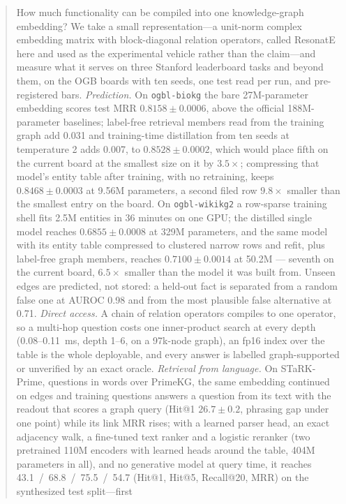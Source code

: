 \documentclass[11pt,a4paper]{article}
\begin{document}
\begin{abstract}
How much functionality can be compiled into one knowledge-graph
embedding? We take a small representation---a unit-norm complex
embedding matrix with block-diagonal relation operators, called ResonatE here and
used as the experimental vehicle rather than the claim---and measure
what it serves on three Stanford leaderboard tasks and beyond them, on
the OGB boards with ten seeds, one test read per run, and
pre-registered bars.
\emph{Prediction.} On \texttt{ogbl-biokg} the bare 27M-parameter embedding
scores test MRR $0.8158\pm0.0006$, above the official 188M-parameter
baselines; label-free retrieval members read from the training graph add
0.031 and training-time distillation from ten seeds at temperature 2 adds
0.007, to $0.8528\pm0.0002$, which would place fifth on the current
board at the smallest size on it by $3.5\times$; compressing that model's
entity table after training, with no retraining, keeps $0.8468\pm0.0003$ at
9.56M parameters, a second filed row $9.8\times$ smaller than the smallest
entry on the board. On \texttt{ogbl-wikikg2} a row-sparse training shell
fits 2.5M entities in 36 minutes on one GPU; the distilled single model
reaches $0.6855\pm0.0008$ at 329M parameters, and the same model with its
entity table compressed to clustered narrow rows and refit, plus
label-free graph members, reaches $0.7100\pm0.0014$ at 50.2M --- seventh on
the current board, $6.5\times$ smaller than the model it was built from. Unseen edges are predicted, not
stored: a held-out fact is separated from a random false one at AUROC
0.98 and from the most plausible false alternative at 0.71.
\emph{Direct access.} A chain of relation operators compiles to one
operator, so a multi-hop question costs one inner-product search at
every depth (0.08--0.11~ms, depth 1--6, on a 97k-node graph), an fp16
index over the table is the whole deployable, and every answer is
labelled graph-supported or unverified by an exact oracle.
\emph{Retrieval from language.} On STaRK-Prime, questions in words over
PrimeKG, the same embedding continued on edges and training questions
answers a question from its text with the readout that scores a graph
query (Hit@1 $26.7\pm0.2$, phrasing gap under one point) while its link
MRR rises; with a learned parser head, an exact adjacency walk, a
fine-tuned text ranker and a logistic reranker (two pretrained 110M
encoders with learned heads around the table, 404M parameters in all),
and no generative model at query time, it reaches 43.1~/~68.8~/~75.5~/~54.7
(Hit@1, Hit@5, Recall@20, MRR) on the synthesized test split---first

\end{abstract}
\end{document}
